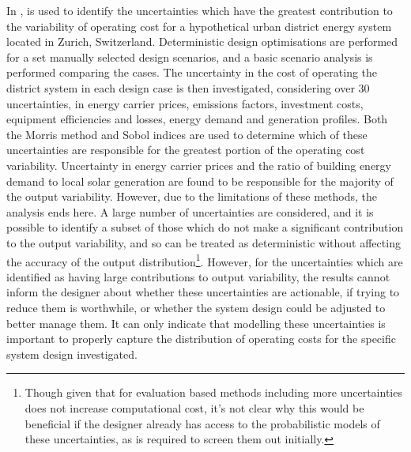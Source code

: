 In ,  is used to identify the uncertainties which have the greatest contribution to the variability of operating cost for a hypothetical urban district energy system located in Zurich, Switzerland. Deterministic design optimisations are performed for a set manually selected design scenarios, and a basic scenario analysis is performed comparing the cases. The uncertainty in the cost of operating the district system in each design case is then investigated, considering over 30 uncertainties, in energy carrier prices, emissions factors, investment costs, equipment efficiencies and losses, energy demand and generation profiles. Both the Morris method and Sobol indices are used to determine which of these uncertainties are responsible for the greatest portion of the operating cost variability. Uncertainty in energy carrier prices and the ratio of building energy demand to local solar generation are found to be responsible for the majority of the output variability. However, due to the limitations of these  methods, the analysis ends here. A large number of uncertainties are considered, and it is possible to identify a subset of those which do not make a significant contribution to the output variability, and so can be treated as deterministic without affecting the accuracy of the output distribution\footnote{Though given that for evaluation based methods including more uncertainties does not increase computational cost, it's not clear why this would be beneficial if the designer already has access to the probabilistic models of these uncertainties, as is required to screen them out initially.}. However, for the uncertainties which are identified as having large contributions to output variability, the results cannot inform the designer about whether these uncertainties are actionable, if trying to reduce them is worthwhile, or whether the system design could be adjusted to better manage them. It can only indicate that modelling these uncertainties is important to properly capture the distribution of operating costs for the specific system design investigated.

